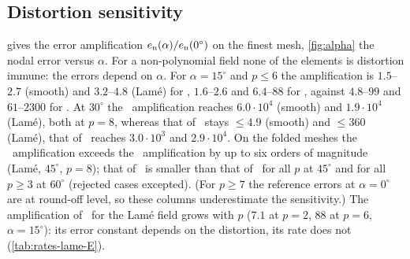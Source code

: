 \begin{table}[t]
  \centering\small
  \caption{Discretisation error over interpolation error in the same trial space, $\eE$, $N=8$:
    smooth field (left) and Lam\'e (right).}
  \label{tab:interp}
  \begin{minipage}[t]{0.48\linewidth}\centering\resizebox{\linewidth}{!}{}\end{minipage}\hfill
  \begin{minipage}[t]{0.48\linewidth}\centering\resizebox{\linewidth}{!}{}\end{minipage}
\end{table}

\subsection{Distortion sensitivity}\label{sec:sens}
 gives the error amplification $\en(\alpha)/\en(0^\circ)$ on the
finest mesh, \cref{fig:alpha} the nodal error versus $\alpha$. For a non-polynomial
field none of the elements is distortion immune: the errors depend on $\alpha$. For
$\alpha=15^\circ$ and $p\le6$ the amplification is $1.5$--$2.7$ (smooth) and $3.2$--$4.8$ (Lam\'e)
for \PM, $1.6$--$2.6$ and $6.4$--$88$ for \PH, against $4.8$--$99$ and $61$--$2300$ for \PP. At
$30^\circ$ the \PM\ amplification reaches $6.0\cdot10^4$ (smooth) and $1.9\cdot10^4$ (Lam\'e), both at $p=8$,
whereas that of \PH\ stays $\le4.9$ (smooth) and $\le360$ (Lam\'e), that of \PP\ reaches
$3.0\cdot10^3$ and $2.9\cdot10^4$. On the folded meshes the \PM\ amplification exceeds the \PP\
amplification by up to six orders of magnitude (Lam\'e, $45^\circ$, $p=8$); that of \PH\ is smaller than that of
\PP\ for all $p$ at $45^\circ$ and for all $p\ge3$ at $60^\circ$ (rejected cases excepted). (For $p\ge7$ the reference errors at $\alpha=0^\circ$
are at round-off level, so these columns underestimate the sensitivity.) The amplification
of \PH\ for the Lam\'e field grows with $p$ ($7.1$ at $p=2$, $88$ at $p=6$, $\alpha=15^\circ$): its
error constant depends on the distortion, its rate does not (\cref{tab:rates-lame-E}).

\begin{table}[t]
  \centering\small
  \caption{Distortion sensitivity on the finest mesh ($N=8$): $\en(\alpha)/\en(0^\circ)$,
    smooth field (left) and Lam\'e (right).}
  \label{tab:ratio}
  \begin{minipage}[t]{0.48\linewidth}\centering\resizebox{\linewidth}{!}{}\end{minipage}\hfill
  \begin{minipage}[t]{0.48\linewidth}\centering\resizebox{\linewidth}{!}{}\end{minipage}
\end{table}

